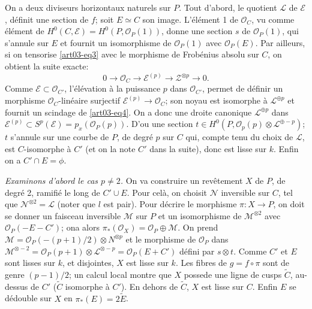 On a deux diviseurs horizontaux naturels sur $P$. Tout d'abord, le
quotient $\mathscr{L}$ de $\mathscr{E}$, d\'efinit une section de $f$;
soit $E\simeq C$ son image. L'\'el\'ement 1 de $\mathscr{O}_{C}$, vu
comme \'el\'ement de
$H^{0}(C,\mathscr{E})=H^{0}(P,\mathscr{O}_{P}(1))$, donne une section
$s$ de $\mathscr{O}_{P}(1)$, qui s'annule sur $E$ et fournit un
isomorphisme de $\mathscr{O}_{P}(1)$ avec $\mathscr{O}_{P}(E)$. Par
ailleurs, si on tensorise \eqref{art03-eq3} avec le morphisme de
Frob\'enius absolu sur $C$, on obtient la suite exacte:
\begin{equation}
0\to \mathscr{O}_{C}\to \mathscr{E}^{(p)}\to \mathscr{Z}^{\otimes p}\to 0.\label{art03-eq4}
\end{equation}
Comme $\mathscr{E}\subset \mathscr{O}_{C'}$, l'\'el\'evation \`a la
puissance $p$ dans $\mathscr{O}_{C'}$, permet de d\'efinir un
morphisme $\mathscr{O}_{C}$-lin\'eaire surjectif
$\mathscr{E}^{(p)}\to \mathscr{O}_{C}$; son noyau est isomorphe \`a
$\mathscr{L}^{\oplus p}$ et fournit un scindage
de \eqref{art03-eq4}. On a donc une droite canonique
$\mathscr{L}^{\oplus p}$ dans $\mathscr{E}^{(p)}\subset
S^{p}(\mathscr{E})=p_{x}(\mathscr{O}_{P}(p))$. D'ou une section $t\in
H^{0}(P,\mathscr{O}_{p}(p)\otimes \mathscr{L}^{\oplus-p})$; $t$
s'annule sur une courbe de $P$, de degr\'e $p$ sur $C$ qui, compte
tenu du choix de $\mathscr{L}$, est $C$-isomorphe \`a $C'$ (et on la
note $C'$ dans la suite), donc est lisse sur $k$. Enfin on a $C'\cap
E=\phi$. 

{\em Examinons d'abord le cas $p\neq 2$.} On va construire un
rev\^ete\-ment $X$ de $P$, de degr\'e 2, ramifi\'e le long de $C'\cup
E$. Pour cel\`a, on choisit $\mathscr{N}$ inversible sur $C$, tel que
$\mathscr{N}^{\otimes 2}=\mathscr{L}$ (noter que $l$ est pair). Pour
d\'ecrire le morphisme $\pi:X\to P$, on doit se donner un faisceau
inversible $\mathscr{M}$ sur $P$ et un isomorphisme de
$\mathscr{M}^{\otimes 2}$ avec $\mathscr{O}_{P}(-E-C')$;
on\pageoriginale a alors
$\pi_{*}(\mathscr{O}_{X})=\mathscr{O}_{P}\oplus \mathscr{M}$. On prend
$\mathscr{M}=\mathscr{O}_{P}(-(p+1)/2)\otimes N^{\otimes p}$ et le
morphisme de $\mathscr{O}_{P}$ dans
$\mathscr{M}^{\otimes-2}=\mathscr{O}_{P}(p+1)\otimes \mathscr{L}^{\otimes
-p}=\mathscr{O}_{P}(E+C')$ d\'efini par $s\otimes t$. Comme $C'$ et
$E$ sont lisses sur $k$, et disjointes, $X$ est lisse sur $k$. Les
fibres de $g=f\circ \pi$ sont de genre $(p-1)/2$; un calcul local
montre que $X$ possede une ligne de cusps $\widetilde{C}$, au-dessus
de $C'$ ($\widetilde{C}$ isomorphe \`a $C'$). En dehors de
$\widetilde{C}$, $X$ est lisse sur $C$. Enfin $E$ se d\'edouble sur
$X$ en $\pi_{*}(E)=2\widetilde{E}$.

